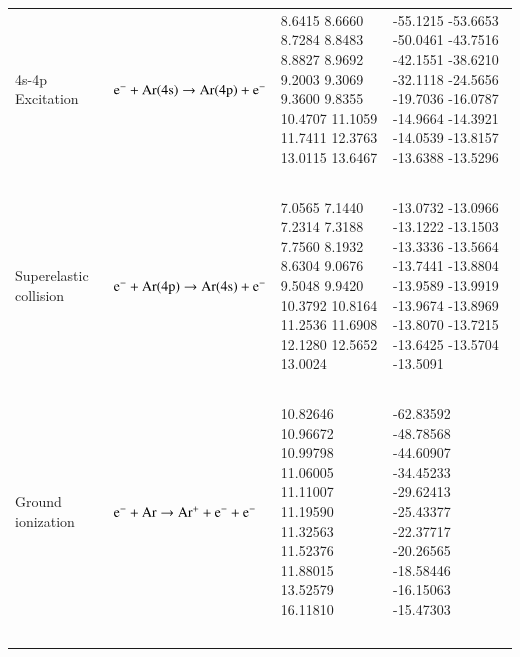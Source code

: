 \documentclass{warpdoc}
\begin{document}
\begin{table}[!ht]
\begin{threeparttable}
\begin{tabular*}{\textwidth}{@{}l@{\extracolsep{\fill}}lll@{}}
4s-4p Excitation & ~{$\rm e^- + Ar(4s) \rightarrow Ar(4p) + e^-$  } &   \begin{minipage}[t]{0.28\textwidth}\raggedright  
8.6415
8.6660
8.7284
8.8483
8.8827
8.9692
9.2003
9.3069
9.3600
9.8355
10.4707
11.1059
11.7411
12.3763
13.0115
13.6467
 \end{minipage}  & \begin{minipage}[t]{0.28\textwidth}\raggedright 
-55.1215
-53.6653
-50.0461
-43.7516
-42.1551
-38.6210
-32.1118
-24.5656
-19.7036
-16.0787
-14.9664
-14.3921
-14.0539
-13.8157
-13.6388
-13.5296
\end{minipage} \\         
~\\

Superelastic collision & ~{$\rm e^- + Ar(4p) \rightarrow Ar(4s)  + e^-$  } &   \begin{minipage}[t]{0.28\textwidth}\raggedright  
7.0565
7.1440
7.2314
7.3188
7.7560
8.1932
8.6304
9.0676
9.5048
9.9420
10.3792
10.8164
11.2536
11.6908
12.1280
12.5652
13.0024

 \end{minipage}  & \begin{minipage}[t]{0.28\textwidth}\raggedright 
-13.0732
-13.0966
-13.1222
-13.1503
-13.3336
-13.5664
-13.7441
-13.8804
-13.9589
-13.9919
-13.9674
-13.8969
-13.8070
-13.7215
-13.6425
-13.5704
-13.5091
\end{minipage} \\         
~\\

Ground ionization & ~{$\rm e^- + Ar \rightarrow Ar^+ + e^- + e^-$  } &   \begin{minipage}[t]{0.28\textwidth}\raggedright  
    10.82646
    10.96672
    10.99798
    11.06005
    11.11007
    11.19590
    11.32563
    11.52376
    11.88015
    13.52579
    16.11810
 \end{minipage}  & \begin{minipage}[t]{0.28\textwidth}\raggedright 
    -62.83592
    -48.78568
    -44.60907
    -34.45233
    -29.62413
    -25.43377
    -22.37717
    -20.26565
    -18.58446
    -16.15063
    -15.47303
\end{minipage} \\         
~\\



\end{tabular*}
\end{threeparttable}
\end{table}
\end{document}
